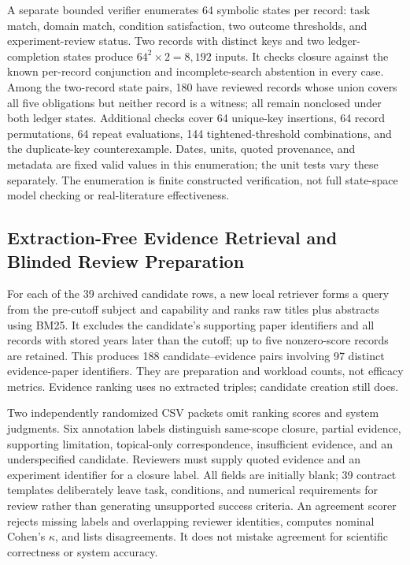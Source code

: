 \documentclass[runningheads]{llncs}
\begin{document}
A separate bounded verifier enumerates 64 symbolic states per record: task match, domain match, condition satisfaction, two outcome thresholds, and experiment-review status. Two records with distinct keys and two ledger-completion states produce $64^2\times2=8,192$ inputs. It checks closure against the known per-record conjunction and incomplete-search abstention in every case. Among the two-record state pairs, 180 have reviewed records whose union covers all five obligations but neither record is a witness; all remain nonclosed under both ledger states. Additional checks cover 64 unique-key insertions, 64 record permutations, 64 repeat evaluations, 144 tightened-threshold combinations, and the duplicate-key counterexample. Dates, units, quoted provenance, and metadata are fixed valid values in this enumeration; the unit tests vary these separately. The enumeration is finite constructed verification, not full state-space model checking or real-literature effectiveness.

\subsection{Extraction-Free Evidence Retrieval and Blinded Review Preparation}
For each of the 39 archived candidate rows, a new local retriever forms a query from the pre-cutoff subject and capability and ranks raw titles plus abstracts using BM25. It excludes the candidate's supporting paper identifiers and all records with stored years later than the cutoff; up to five nonzero-score records are retained. This produces 188 candidate--evidence pairs involving 97 distinct evidence-paper identifiers. They are preparation and workload counts, not efficacy metrics. Evidence ranking uses no extracted triples; candidate creation still does.

Two independently randomized CSV packets omit ranking scores and system judgments. Six annotation labels distinguish same-scope closure, partial evidence, supporting limitation, topical-only correspondence, insufficient evidence, and an underspecified candidate. Reviewers must supply quoted evidence and an experiment identifier for a closure label. All fields are initially blank; 39 contract templates deliberately leave task, conditions, and numerical requirements for review rather than generating unsupported success criteria. An agreement scorer rejects missing labels and overlapping reviewer identities, computes nominal Cohen's $\kappa$, and lists disagreements. It does not mistake agreement for scientific correctness or system accuracy.
\end{document}
